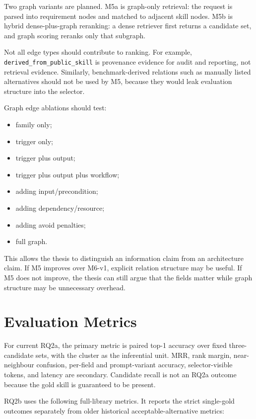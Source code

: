 Two graph variants are planned. M5a is graph-only retrieval: the request is parsed into requirement nodes and matched to adjacent skill nodes. M5b is hybrid dense-plus-graph reranking: a dense retriever first returns a candidate set, and graph scoring reranks only that subgraph.

Not all edge types should contribute to ranking. For example, \texttt{derived\_from\_public\_skill} is provenance evidence for audit and reporting, not retrieval evidence. Similarly, benchmark-derived relations such as manually listed alternatives should not be used by M5, because they would leak evaluation structure into the selector.

Graph edge ablations should test:

\begin{itemize}
  \item family only;
  \item trigger only;
  \item trigger plus output;
  \item trigger plus output plus workflow;
  \item adding input/precondition;
  \item adding dependency/resource;
  \item adding avoid penalties;
  \item full graph.
\end{itemize}

This allows the thesis to distinguish an information claim from an architecture claim. If M5 improves over M6-v1, explicit relation structure may be useful. If M5 does not improve, the thesis can still argue that the fields matter while graph structure may be unnecessary overhead.

\section{Evaluation Metrics}

For current RQ2a, the primary metric is paired top-1 accuracy over fixed three-candidate sets, with the cluster as the inferential unit. MRR, rank margin, near-neighbour confusion, per-field and prompt-variant accuracy, selector-visible tokens, and latency are secondary. Candidate recall is not an RQ2a outcome because the gold skill is guaranteed to be present.

RQ2b uses the following full-library metrics. It reports the strict single-gold outcomes separately from older historical acceptable-alternative metrics:

